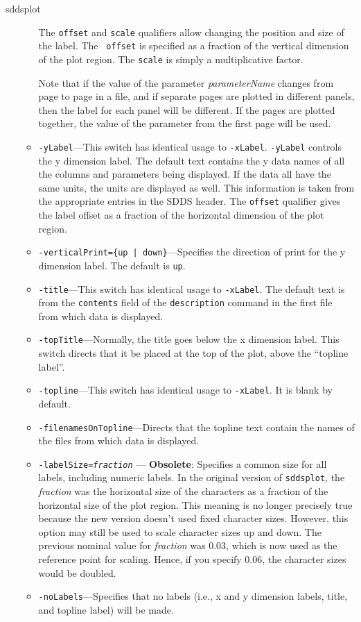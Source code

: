 \begin{sddsprog}{sddsplot}
\begin{itemize}
\begin{itemize}
The {\tt offset} and {\tt scale} qualifiers allow changing the position and size of the label.  The {\tt
offset} is specified as a fraction of the vertical dimension of the plot region.  The {\tt scale} is
simply a multiplicative factor.

Note that if the value of the parameter {\em parameterName} changes from page to page in a file, and if separate pages are
plotted in different panels, then the label for each panel will be different.  If the pages are plotted together, the value
of the parameter from the first page will be used.

  \item {\tt -yLabel}---This switch has identical usage to {\tt -xLabel}.  {\tt -yLabel} controls the y dimension label.  The
default text contains the y data names of all the columns and parameters being displayed.  If the data all have the same
units, the units are displayed as well.  This information is taken from the appropriate entries in the SDDS header.
The {\tt offset} qualifier gives the label offset as a fraction of the horizontal dimension of the plot region.

  \item {\tt -verticalPrint=\{up | down\}}---Specifies the direction of print for the y dimension label.
The default is {\tt up}.

  \item {\tt -title}---This switch has identical usage to {\tt -xLabel}.  The default text is from the {\tt contents}
field of the {\tt description} command in the first file from which data is displayed.  
  \item {\tt -topTitle}---Normally, the title goes below the x dimension label.  This switch directs that it be placed
at the top of the plot, above the ``topline label''.
  \item {\tt -topline}---This switch has identical usage to {\tt -xLabel}.  It is blank by default.
  \item {\tt -filenamesOnTopline}---Directs that the topline text contain the names of the files from which data
is displayed.
  \item {\tt -labelSize={\em fraction}} --- \textbf{Obsolete}:
Specifies a common size for all labels, including numeric labels.  
In the original version of \verb|sddsplot|, the {\em fraction} was the horizontal size of the characters as a 
fraction of the horizontal size of the plot region.  This meaning is no longer precisely true because the
new version doesn't used fixed character sizes.  However, this option may still be used to scale character
sizes up and down.  The previous nominal value for {\em fraction} was 0.03, which is now used as the reference
point for scaling.  Hence, if you specify 0.06, the character sizes would be doubled.  
  \item {\tt -noLabels}---Specifies that no labels (i.e., x and y dimension labels, title, and topline label) will be
made.  


\end{itemize}
\end{itemize}
\end{sddsprog}
